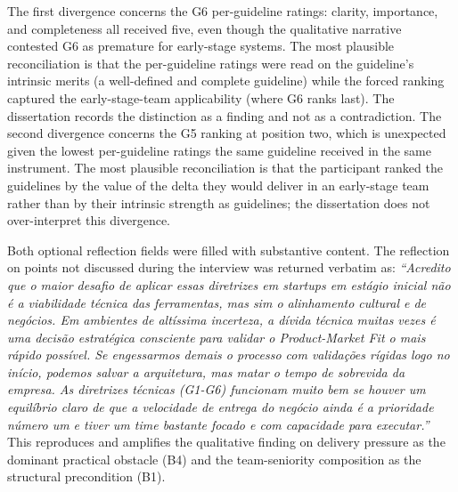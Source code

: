 The first divergence concerns the G6 per-guideline ratings: clarity, importance, and completeness all received five, even though the qualitative narrative contested G6 as premature for early-stage systems. The most plausible reconciliation is that the per-guideline ratings were read on the guideline's intrinsic merits (a well-defined and complete guideline) while the forced ranking captured the early-stage-team applicability (where G6 ranks last). The dissertation records the distinction as a finding and not as a contradiction. The second divergence concerns the G5 ranking at position two, which is unexpected given the lowest per-guideline ratings the same guideline received in the same instrument. The most plausible reconciliation is that the participant ranked the guidelines by the value of the delta they would deliver in an early-stage team rather than by their intrinsic strength as guidelines; the dissertation does not over-interpret this divergence.

Both optional reflection fields were filled with substantive content. The reflection on points not discussed during the interview was returned verbatim as: \emph{``Acredito que o maior desafio de aplicar essas diretrizes em startups em est\'agio inicial n\~ao \'e a viabilidade t\'ecnica das ferramentas, mas sim o alinhamento cultural e de neg\'ocios. Em ambientes de alt\'issima incerteza, a d\'ivida t\'ecnica muitas vezes \'e uma decis\~ao estrat\'egica consciente para validar o Product-Market Fit o mais r\'apido poss\'ivel. Se engessarmos demais o processo com valida\c{c}\~oes r\'igidas logo no in\'icio, podemos salvar a arquitetura, mas matar o tempo de sobrevida da empresa. As diretrizes t\'ecnicas (G1-G6) funcionam muito bem se houver um equil\'ibrio claro de que a velocidade de entrega do neg\'ocio ainda \'e a prioridade n\'umero um e tiver um time bastante focado e com capacidade para executar.''} This reproduces and amplifies the qualitative finding on delivery pressure as the dominant practical obstacle (B4) and the team-seniority composition as the structural precondition (B1).

